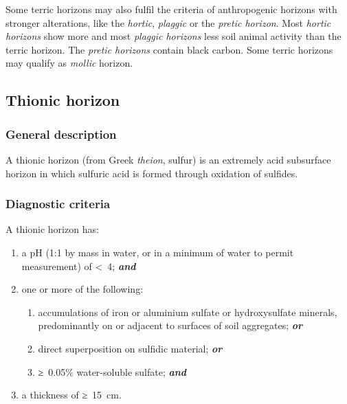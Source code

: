 \documentclass[
  letterpaper,
  DIV=11,
  numbers=noendperiod]{scrreprt}
\providecommand{\tightlist}{%
  \setlength{\itemsep}{0pt}\setlength{\parskip}{0pt}}\usepackage{longtable,booktabs,array}
\begin{document}
Some terric horizons may also fulfil the criteria of anthropogenic
horizons with stronger alterations, like the \emph{hortic},
\emph{plaggic} or the \emph{pretic horizon}. Most \emph{hortic horizons}
show more and most \emph{plaggic horizons} less soil animal activity
than the terric horizon. The \emph{pretic horizons} contain black
carbon. Some terric horizons may qualify as \emph{mollic} horizon.

\hypertarget{thionic-horizon}{%
\subsection{Thionic horizon}\label{thionic-horizon}}

\hypertarget{general-description-36}{%
\subsubsection{General description}\label{general-description-36}}

A thionic horizon (from Greek \emph{theion}, sulfur) is an extremely
acid subsurface horizon in which sulfuric acid is formed through
oxidation of sulfides.

\hypertarget{diagnostic-criteria-36}{%
\subsubsection{Diagnostic criteria}\label{diagnostic-criteria-36}}

A thionic horizon has:

\begin{enumerate}
\def\labelenumi{\arabic{enumi}.}
\tightlist
\item
  a pH (1:1 by mass in water, or in a minimum of water to permit
  measurement) of \textless~4; \textbf{\emph{and}}
\item
  one or more of the following:

  \begin{enumerate}
  \def\labelenumii{\alph{enumii}.}
  \tightlist
  \item
    accumulations of iron or aluminium sulfate or hydroxysulfate
    minerals, predominantly on or adjacent to surfaces of soil
    aggregates; \textbf{\emph{or}}
  \item
    direct superposition on sulfidic material; \textbf{\emph{or}}
  \item
    ≥~0.05\% water-soluble sulfate; \textbf{\emph{and}}
  \end{enumerate}
\item
  a thickness of ≥~15~cm.
\end{enumerate}
\end{document}
